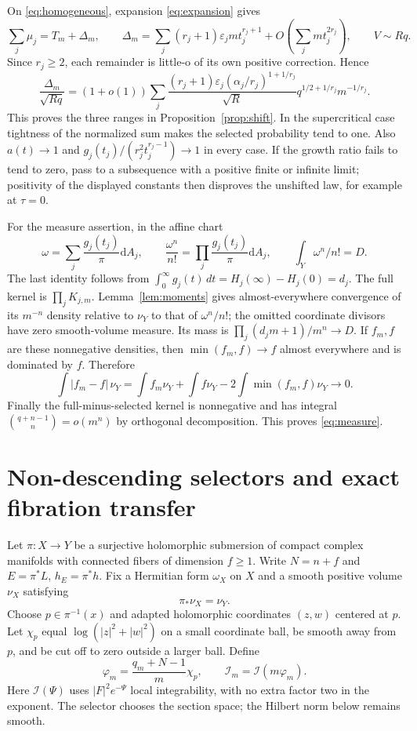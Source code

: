 \documentclass[11pt]{article}
\theoremstyle{remark}\newtheorem{remark}[theorem]{Remark}
\newcommand{\dA}{\mathrm dA}
\newcommand{\II}{\mathcal I}
\begin{document}
On \eqref{eq:homogeneous}, expansion \eqref{eq:expansion} gives
\[
 \sum_j\mu_j=T_m+\Delta_m,\qquad
 \Delta_m=\sum_j(r_j+1)\varepsilon_j mt_j^{r_j+1}
              +O\left(\sum_jmt_j^{2r_j}\right),\qquad V\sim Rq.
\]
Since $r_j\geq2$, each remainder is little-o of its own positive
correction. Hence
\[
 \frac{\Delta_m}{\sqrt{Rq}}=(1+o(1))\sum_j
 \frac{(r_j+1)\varepsilon_j(\alpha_j/r_j)^{1+1/r_j}}{\sqrt R}
 q^{1/2+1/r_j}m^{-1/r_j}.
\]
This proves the three ranges in Proposition~\ref{prop:shift}.
In the supercritical case tightness of the normalized sum makes the
selected probability tend to one. Also $a(t)\to1$ and
$g_j(t_j)/(r_j^2t_j^{r_j-1})\to1$ in every case.
If the growth ratio fails to tend to zero, pass to a subsequence with
a positive finite or infinite limit; positivity of the displayed constants
then disproves the unshifted law, for example at $\tau=0$.

For the measure assertion, in the affine chart
\[
 \omega=\sum_j\frac{g_j(t_j)}\pi\dA_j,\qquad
 \frac{\omega^n}{n!}=\prod_j\frac{g_j(t_j)}\pi\dA_j,
 \qquad \int_Y\omega^n/n!=D.
\]
The last identity follows from
$\int_0^\infty g_j(t)\,dt=H_j(\infty)-H_j(0)=d_j$.
The full kernel is $\prod_jK_{j,m}$. Lemma~\ref{lem:moments} gives
almost-everywhere convergence of its $m^{-n}$ density relative to
$\nu_Y$ to that of $\omega^n/n!$; the omitted coordinate divisors
have zero smooth-volume measure. Its mass is
$\prod_j(d_jm+1)/m^n\to D$. If $f_m,f$ are these nonnegative
densities, then $\min(f_m,f)\to f$ almost everywhere and is dominated
by $f$. Therefore
\[
 \int|f_m-f|\,\nu_Y
 =\int f_m\nu_Y+\int f\nu_Y-2\int\min(f_m,f)\nu_Y\longrightarrow0.
\]
Finally the full-minus-selected kernel is nonnegative and has integral
$\binom{q+n-1}{n}=o(m^n)$ by orthogonal decomposition. This proves
\eqref{eq:measure}.

\section{Non-descending selectors and exact fibration transfer}
Let $\pi:X\to Y$ be a surjective holomorphic submersion of compact
complex manifolds with connected fibers of dimension $f\geq1$.
Write $N=n+f$ and $E=\pi^*L$, $h_E=\pi^*h$. Fix a Hermitian
form $\omega_X$ on $X$ and a smooth positive volume $\nu_X$ satisfying
\begin{equation}\label{eq:matched}
 \pi_*\nu_X=\nu_Y.
\end{equation}
Choose $p\in\pi^{-1}(x)$ and adapted holomorphic coordinates $(z,w)$
centered at $p$. Let $\chi_p$ equal $\log(|z|^2+|w|^2)$ on a
small coordinate ball, be smooth away from $p$, and be cut off to zero
outside a larger ball. Define
\begin{equation}\label{eq:selector}
 \varphi_m=\frac{q_m+N-1}{m}\chi_p,\qquad
 \II_m=\II(m\varphi_m).
\end{equation}
Here $\II(\Psi)$ uses $|F|^2e^{-\Psi}$ local integrability, with
no extra factor two in the exponent. The selector chooses the section
space; the Hilbert norm below remains smooth.
\end{document}
